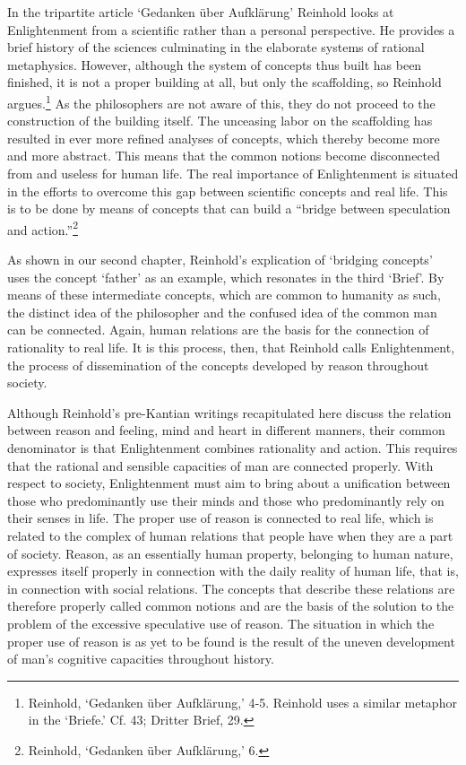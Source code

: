  In the tripartite article `Gedanken \"{u}ber Aufkl\"{a}rung' Reinhold looks at Enlightenment from a scientific rather than a personal perspective. He provides a brief history of the sciences culminating in the elaborate systems of rational metaphysics. However, although the system of concepts thus built has been finished, it is not a proper building at all, but only the scaffolding, so Reinhold argues.\footnote{ Reinhold, `Gedanken \"{u}ber Aufkl\"{a}rung,' 4{-}5. Reinhold uses a similar metaphor in the `Briefe.' Cf. 43; Dritter Brief, 29. } As the philosophers are not aware of this, they do not proceed to the construction of the building itself. The unceasing labor on the scaffolding has resulted in ever more refined analyses of concepts, which thereby become more and more abstract. This means that the common notions become disconnected from and useless for human life. The real importance of Enlightenment is situated in the efforts to overcome this gap between scientific concepts and real life. This is to be done by means of concepts that can build a ``bridge between speculation and action.''\footnote{ Reinhold, `Gedanken \"{u}ber Aufkl\"{a}rung,' 6. } 

 As shown in our second chapter, Reinhold's explication of `bridging concepts' uses the concept `father' as an example, which resonates in the third `Brief'. By means of these intermediate concepts, which are common to humanity as such, the distinct idea of the philosopher and the confused idea of the common man can be connected. Again, human relations are the basis for the connection of rationality to real life. It is this process, then, that Reinhold calls Enlightenment, the process of dissemination of the concepts developed by reason throughout society. 

 Although Reinhold's pre{-}Kantian writings recapitulated here discuss the relation between reason and feeling, mind and heart in different manners, their common denominator is that Enlightenment combines rationality and action. This requires that the rational and sensible capacities of man are connected properly. With respect to society, Enlightenment must aim to bring about a unification between those who predominantly use their minds and those who predominantly rely on their senses in life. The proper use of reason is connected to real life, which is related to the complex of human relations that people have when they are a part of society. Reason, as an essentially human property, belonging to human nature, expresses itself properly in connection with the daily reality of human life, that is, in connection with social relations. The concepts that describe these relations are therefore properly called common notions and are the basis of the solution to the problem of the excessive speculative use of reason. The situation in which the proper use of reason is as yet to be found is the result of the uneven development of man's cognitive capacities throughout history.

